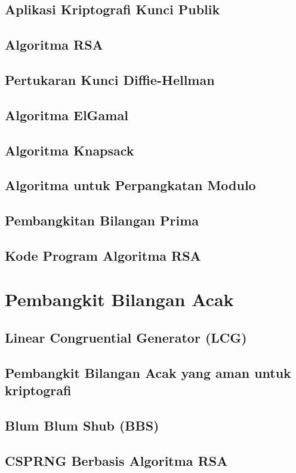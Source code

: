 \documentclass{book}
\begin{document}
     \section{Aplikasi Kriptografi Kunci Publik}
     \section{Algoritma RSA}
     \section{Pertukaran Kunci Diffie-Hellman}
     \section{Algoritma ElGamal}
     \section{Algoritma Knapsack}
     \section{Algoritma untuk Perpangkatan Modulo}
     \section{Pembangkitan Bilangan Prima}
     \section{Kode Program Algoritma RSA}
\chapter{Pembangkit Bilangan Acak}
    \section{Linear Congruential Generator (LCG)}
    \section{Pembangkit Bilangan Acak yang aman untuk kriptografi}
    \section{Blum Blum Shub (BBS)}
    \section{CSPRNG Berbasis Algoritma RSA}
\end{document}
